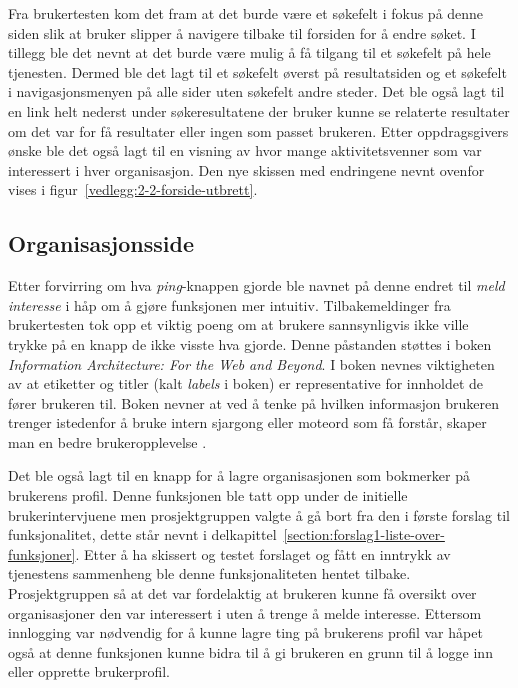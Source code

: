Fra brukertesten kom det fram at det burde være et søkefelt i fokus på denne siden slik at bruker slipper å navigere tilbake til forsiden for å endre søket. I tillegg ble det nevnt at det burde være mulig å få tilgang til et søkefelt på hele tjenesten. Dermed ble det lagt til et søkefelt øverst på resultatsiden og et søkefelt i navigasjonsmenyen på alle sider uten søkefelt andre steder. Det ble også lagt til en link helt nederst under søkeresultatene der bruker kunne se relaterte resultater om det var for få resultater eller ingen som passet brukeren. Etter oppdragsgivers ønske ble det også lagt til en visning av hvor mange aktivitetsvenner som var interessert i hver organisasjon. Den nye skissen med endringene nevnt ovenfor vises i figur~\ref{vedlegg:2-2-forside-utbrett}.

\subsection{Organisasjonsside}

Etter forvirring om hva {\em  ping}-knappen gjorde ble navnet på denne endret til {\em  meld interesse} i håp om å gjøre funksjonen mer intuitiv. Tilbakemeldinger fra brukertesten tok opp et viktig poeng om at brukere sannsynligvis ikke ville trykke på en knapp de ikke visste hva gjorde. Denne påstanden støttes i boken {\em  Information Architecture: For the Web and Beyond}. I boken nevnes viktigheten av at etiketter og titler (kalt {\em  labels} i boken) er representative for innholdet de fører brukeren til. Boken nevner at ved å tenke på hvilken informasjon brukeren trenger istedenfor å bruke intern sjargong eller moteord som få forstår, skaper man en bedre brukeropplevelse \cite{INFARC:1}.

Det ble også lagt til en knapp for å lagre organisasjonen som bokmerker på brukerens profil. Denne funksjonen ble tatt opp under de initielle brukerintervjuene men prosjektgruppen valgte å gå bort fra den i første forslag til funksjonalitet, dette står nevnt i delkapittel~\ref{section:forslag1-liste-over-funksjoner}. Etter å ha skissert og testet forslaget og fått en inntrykk av tjenestens sammenheng ble denne funksjonaliteten hentet tilbake. Prosjektgruppen så at det var fordelaktig at brukeren kunne få oversikt over organisasjoner den var interessert i uten å trenge å melde interesse. Ettersom innlogging var nødvendig for å kunne lagre ting på brukerens profil var håpet også at denne funksjonen kunne bidra til å gi brukeren en grunn til å logge inn eller opprette brukerprofil.

